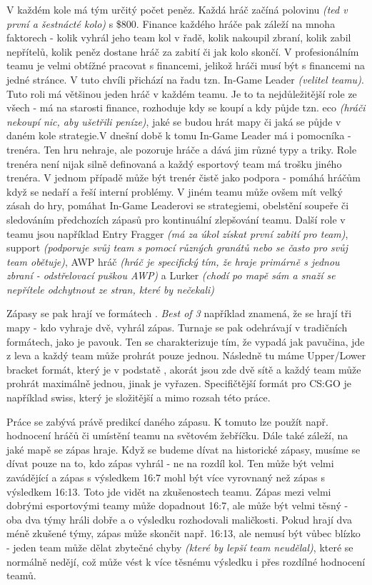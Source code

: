V každém kole má tým určitý počet peněz. Každá hráč začíná polovinu \textit{(ted v první a šestnácté kolo)} s \$800. Finance každého hráče pak záleží na mnoha faktorech - kolik vyhrál jeho team kol v řadě, kolik nakoupil
zbraní, kolik zabil nepřítelů, kolik peněz dostane hráč za zabití či jak kolo skončí. V profesionálním teamu je velmi obtížné pracovat s financemi, jelikož hráči musí být s financemi na jedné stránce. V tuto chvíli přichází
na řadu tzn. In-Game Leader \textit{(velitel teamu)}. Tuto roli má většinou jeden hráč v každém teamu. Je to ta nejdůležitější role ze všech - má na starosti finance, rozhoduje kdy se koupí a kdy půjde tzn. eco 
\textit{(hráči nekoupí nic, aby ušetřili peníze)}, jaké se budou hrát mapy či jaká se půjde v daném kole strategie.V dnešní době k tomu In-Game Leader má i pomocníka - trenéra. Ten hru nehraje, ale pozoruje hráče a dává jim
různé typy a triky. Role trenéra není nijak silně definovaná a každý esportový team má trošku jiného trenéra. V jednom případě může být trenér čistě jako podpora - pomáhá hráčům když se nedaří a řeší interní problémy. V jiném
teamu může ovšem mít velký zásah do hry, pomáhat In-Game Leaderovi se strategiemi, obelstění soupeře či sledováním předchozích zápasů pro kontinuální zlepšování teamu.
Další role v teamu jsou například Entry Fragger \textit{(má za úkol získat první zabití pro team)}, support \textit{(podporuje svůj team s pomocí různých granátů nebo se často pro svůj team obětuje)}, AWP hráč
\textit{(hráč je specifický tím, že hraje primárně s jednou zbraní - odstřelovací puškou AWP)} a Lurker \textit{(chodí po mapě sám a snaží se nepřítele odchytnout ze stran, které by nečekali)}

Zápasy se pak hrají ve formátech . \textit{Best of 3} například znamená, že se hrají tři mapy - kdo vyhraje dvě, vyhrál zápas. Turnaje se pak odehrávají v tradičních formátech, jako je pavouk.
Ten se charakterizuje tím, že vypadá jak pavučina, jde z leva a každý team může prohrát pouze jednou. Následně tu máme Upper/Lower bracket formát, který je v podstatě , akorát jsou zde dvě
sítě a každý team může prohrát maximálně jednou, jinak je vyřazen. Specifičtější formát pro \ac{CS:GO} je například swiss, který je složitější a mimo rozsah této práce.

Práce se zabývá právě predikcí daného zápasu. K tomuto lze použít např. hodnocení hráčů či umístění teamu na světovém žebříčku. Dále také záleží, na jaké mapě se zápas hraje. Když se budeme dívat na historické 
zápasy, musíme se dívat pouze na to, kdo zápas vyhrál - ne na rozdíl kol. Ten může být velmi zavádějící a zápas s výsledkem 16:7 mohl být více vyrovnaný než zápas s výsledkem 16:13. Toto jde vidět na zkušenostech teamu.
Zápas mezi velmi dobrými esportovými teamy může dopadnout 16:7, ale může být velmi těsný - oba dva týmy hráli dobře a o výsledku rozhodovali maličkosti. Pokud hrají dva méně zkušené týmy, zápas může skončit např. 16:13,
ale nemusí být vůbec blízko - jeden team může dělat zbytečné chyby \textit{(které by lepší team neudělal)}, které se normálně nedějí, což může vést k více těsnému výsledku i přes rozdílné hodnocení teamů.  